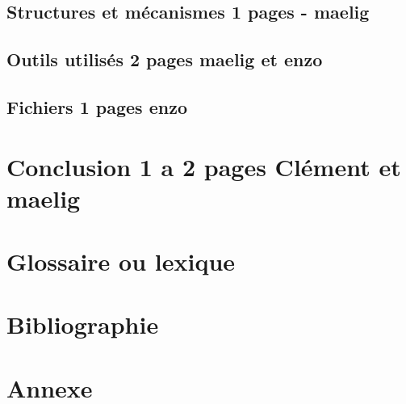 \documentclass[10pt]{article}
\begin{document}
   \subsection{Structures et mécanismes 1 pages - maelig}
   \subsection{Outils utilisés 2 pages maelig et enzo}
   \subsection{Fichiers 1 pages enzo}
   
\section{Conclusion 1 a 2 pages Clément et maelig}

\section{Glossaire ou lexique}

\section{Bibliographie}

\section{Annexe}
\end{document}

